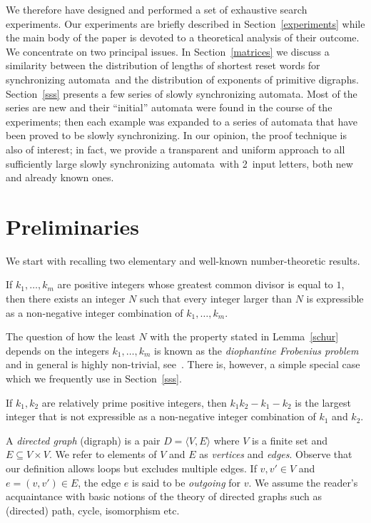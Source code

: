 \documentclass[11pt]{llncs}
\newcommand{\sa}{synchronizing automata}
\begin{document}
We therefore have designed and performed a set of exhaustive search
experiments. Our experiments are briefly described in Section~\ref{experiments}
while the main body of the paper is devoted to a theoretical analysis
of their outcome. We concentrate on two principal issues. In Section~\ref{matrices}
we discuss a similarity between the distribution of lengths of shortest
reset words for \sa\ and the distribution of exponents of primitive digraphs.
Section~\ref{sss} presents a few series of slowly \sa. Most of the series
are new and their ``initial'' automata were found in the course of the experiments;
then each example was expanded to a series of automata that have been proved
to be slowly synchronizing. In our opinion, the proof technique is also
of interest; in fact, we provide a transparent and uniform approach to all
sufficiently large slowly \sa\ with 2~input letters, both new and already
known ones.

\section{Preliminaries}
\label{preliminaries}

We start with recalling two elementary and well-known number-theoretic results.
\begin{lemma}
\label{schur}
If $k_1,\dots,k_m$ are positive integers whose greatest common divisor is equal
to\/ $1$, then there exists an integer $N$ such that every integer larger than $N$
is expressible as a non-negative integer combination of $k_1,\dots,k_m$.
\end{lemma}
The question of how the least $N$ with the property stated in Lemma~\ref{schur}
depends on the integers $k_1,\dots,k_m$ is known as the \emph{diophantine Frobenius
problem} and in general is highly non-trivial, see~\cite{RaAl05}. There is, however,
a simple special case which we frequently use in Section~\ref{sss}.
\begin{lemma}
\label{sylvester}
If $k_1,k_2$ are relatively prime positive integers, then $k_1k_2-k_1-k_2$ is
the largest integer that is not expressible as a non-negative integer combination
of $k_1$ and $k_2$.
\end{lemma}

A \emph{directed graph} (digraph) is a pair $D=\langle V,E\rangle$ where $V$ is
a finite set and $E\subseteq V\times V$. We refer to elements of $V$ and $E$ as
\emph{vertices} and \emph{edges}. Observe that our definition allows loops but
excludes multiple edges. If $v,v'\in V$ and $e=(v,v')\in E$, the edge $e$ is said
to be \emph{outgoing} for $v$. We assume the reader's acquaintance with basic
notions of the theory of directed graphs such as (directed) path,
cycle, isomorphism etc.
\end{document}
